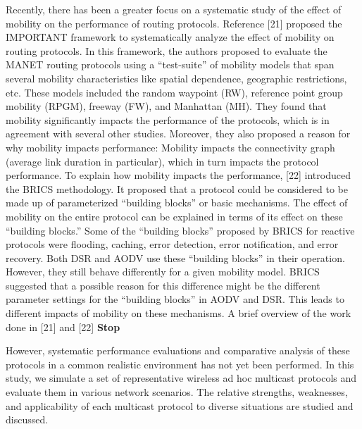 \documentclass[letterpaper, 10 pt, conference]{ieeeconf}  %
\begin{document}
Recently, there has been a greater focus on a systematic
study of the effect of mobility on the performance of routing
protocols. Reference [21] proposed the IMPORTANT framework
to systematically analyze the effect of mobility on routing
protocols. In this framework, the authors proposed to evaluate
the MANET routing protocols using a “test-suite” of
mobility models that span several mobility characteristics like
spatial dependence, geographic restrictions, etc. These models
included the random waypoint (RW), reference point group
mobility (RPGM), freeway (FW), and Manhattan (MH). They
found that mobility significantly impacts the performance of
the protocols, which is in agreement with several other studies.
Moreover, they also proposed a reason for why mobility impacts
performance: Mobility impacts the connectivity graph (average
link duration in particular), which in turn impacts the protocol
performance.
To explain how mobility impacts the performance, [22] introduced
the BRICS methodology. It proposed that a protocol
could be considered to be made up of parameterized “building
blocks” or basic mechanisms. The effect of mobility on the entire
protocol can be explained in terms of its effect on these
“building blocks.” Some of the “building blocks” proposed by
BRICS for reactive protocols were flooding, caching, error detection,
error notification, and error recovery. Both DSR and
AODV use these “building blocks” in their operation. However,
they still behave differently for a given mobility model. BRICS
suggested that a possible reason for this difference might be the
different parameter settings for the “building blocks” in AODV
and DSR. This leads to different impacts of mobility on these
mechanisms. A brief overview of the work done in [21] and [22]
\cite{Bai2004ModelingProtocols}
\textbf{Stop}

However, systematic performance evaluations and comparative analysis of these protocols in a common realistic environment has not yet been performed. In this study, we simulate a set of representative wireless ad hoc multicast protocols and evaluate them in various network scenarios. The relative strengths, weaknesses, and applicability of each multicast protocol to diverse situations are
studied and discussed. 
\end{document}
